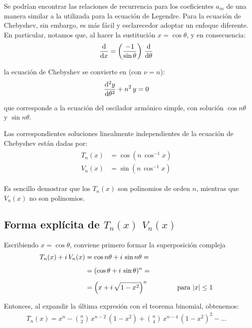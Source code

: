Se podrían encontrar las relaciones de recurrencia para los coeficientes $a_{m}$ de una manera similar a la utilizada para la ecuación de Legendre. Para la ecuación de Chebyshev, sin embargo, es más fácil y esclarecedor adoptar un enfoque diferente. En particular, notamos que, al hacer la sustitución $x = \cos \theta$, y en consecuencia:
\begin{align*}
\dv{x} = \left( \dfrac{-1}{\sin \theta} \right) \, \dv{\theta}
\end{align*}

la ecuación de Chebyshev se convierte en (con $\nu = n$):
\begin{align*}
\dv[2]{y}{\theta} + n^{2} \, y = 0
\end{align*}

que corresponde a la ecuación del oscilador armónico simple, con solución $\cos n \theta$ y $\sin n \theta$. 
\par
Las correspondientes soluciones linealmente independientes de la ecuación de Chebyshev están dadas por:
\begin{align}
\begin{aligned}
T_{n} (x) &= \cos (n \, \cos^{-1} x) \\[0.5em]
V_{n} (x) &= \sin (n \, \cos^{-1} x)
\end{aligned}
\label{eq:ecuacion_18_055}
\end{align}

Es sencillo demostrar que los $T_{n} (x)$ son polinomios de orden $n$, mientras que $V_{n} (x)$ no son polinomios.

\subsection{Forma explícita de \texorpdfstring{{$T_{n}(x)$}{}} y \texorpdfstring{{$V_{n}(x)$}{}} .}

Escribiendo $x = \cos \theta$, conviene primero formar la superposición compleja
\begin{align*}
T_{n}(x) + i \, V_{n} (x) &= \cos n \theta + i \, \sin n \theta = \\[0.5em]
&= (\cos \theta + i \, \sin \theta)^{n} = \\[0.5em]
&= \left( x + i \, \sqrt{1- x^{2}} \right)^{n} \hspace{1.5cm} \mbox{para  } \abs{x} \leq 1
\end{align*}

Entonces, al expandir la última expresión con el teorema binomial, obtenemos:
\begin{align}
T_{n}(x) = x^{n} - \binom{n}{2} \, x^{n-2} \, (1 - x^{2}) + \binom{n}{4} \, x^{n-4} \, (1 - x^{2})^{2} - \ldots \label{eq:ecuacion_18_056}
\end{align}

